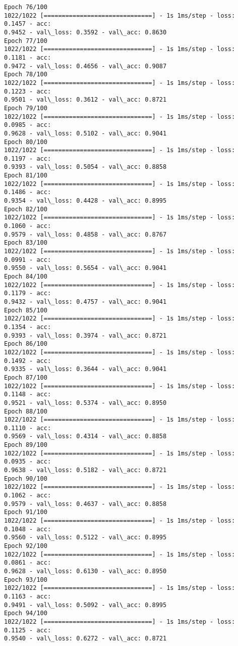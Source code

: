 \documentclass[11pt]{article}
\begin{document}
\begin{Verbatim}[commandchars=\\\{\}]
Epoch 76/100
1022/1022 [==============================] - 1s 1ms/step - loss: 0.1457 - acc:
0.9452 - val\_loss: 0.3592 - val\_acc: 0.8630
Epoch 77/100
1022/1022 [==============================] - 1s 1ms/step - loss: 0.1181 - acc:
0.9472 - val\_loss: 0.4656 - val\_acc: 0.9087
Epoch 78/100
1022/1022 [==============================] - 1s 1ms/step - loss: 0.1223 - acc:
0.9501 - val\_loss: 0.3612 - val\_acc: 0.8721
Epoch 79/100
1022/1022 [==============================] - 1s 1ms/step - loss: 0.0985 - acc:
0.9628 - val\_loss: 0.5102 - val\_acc: 0.9041
Epoch 80/100
1022/1022 [==============================] - 1s 1ms/step - loss: 0.1197 - acc:
0.9393 - val\_loss: 0.5054 - val\_acc: 0.8858
Epoch 81/100
1022/1022 [==============================] - 1s 1ms/step - loss: 0.1486 - acc:
0.9354 - val\_loss: 0.4428 - val\_acc: 0.8995
Epoch 82/100
1022/1022 [==============================] - 1s 1ms/step - loss: 0.1060 - acc:
0.9579 - val\_loss: 0.4858 - val\_acc: 0.8767
Epoch 83/100
1022/1022 [==============================] - 1s 1ms/step - loss: 0.0991 - acc:
0.9550 - val\_loss: 0.5654 - val\_acc: 0.9041
Epoch 84/100
1022/1022 [==============================] - 1s 1ms/step - loss: 0.1179 - acc:
0.9432 - val\_loss: 0.4757 - val\_acc: 0.9041
Epoch 85/100
1022/1022 [==============================] - 1s 1ms/step - loss: 0.1354 - acc:
0.9393 - val\_loss: 0.3974 - val\_acc: 0.8721
Epoch 86/100
1022/1022 [==============================] - 1s 1ms/step - loss: 0.1492 - acc:
0.9335 - val\_loss: 0.3644 - val\_acc: 0.9041
Epoch 87/100
1022/1022 [==============================] - 1s 1ms/step - loss: 0.1148 - acc:
0.9521 - val\_loss: 0.5374 - val\_acc: 0.8950
Epoch 88/100
1022/1022 [==============================] - 1s 1ms/step - loss: 0.1110 - acc:
0.9569 - val\_loss: 0.4314 - val\_acc: 0.8858
Epoch 89/100
1022/1022 [==============================] - 1s 1ms/step - loss: 0.0935 - acc:
0.9638 - val\_loss: 0.5182 - val\_acc: 0.8721
Epoch 90/100
1022/1022 [==============================] - 1s 1ms/step - loss: 0.1062 - acc:
0.9579 - val\_loss: 0.4637 - val\_acc: 0.8858
Epoch 91/100
1022/1022 [==============================] - 1s 1ms/step - loss: 0.1048 - acc:
0.9560 - val\_loss: 0.5122 - val\_acc: 0.8995
Epoch 92/100
1022/1022 [==============================] - 1s 1ms/step - loss: 0.0861 - acc:
0.9628 - val\_loss: 0.6130 - val\_acc: 0.8950
Epoch 93/100
1022/1022 [==============================] - 1s 1ms/step - loss: 0.1163 - acc:
0.9491 - val\_loss: 0.5092 - val\_acc: 0.8995
Epoch 94/100
1022/1022 [==============================] - 1s 1ms/step - loss: 0.1125 - acc:
0.9540 - val\_loss: 0.6272 - val\_acc: 0.8721

\end{Verbatim}
\end{document}
